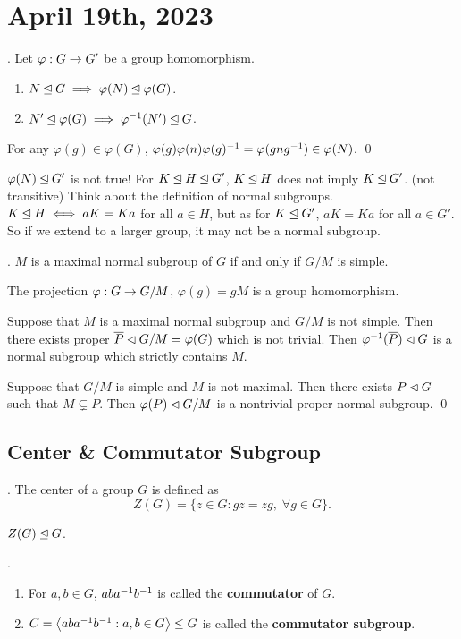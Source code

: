 \section*{April 19th, 2023}

\prop. Let \(\varphi : G \rightarrow G'\) be a group homomorphism.
\begin{enumerate}
    \item \(N \unlhd G \implies \varphi(N) \unlhd \varphi(G)\).
    \item \(N' \unlhd \varphi(G) \implies \varphi^{-1}(N') \unlhd G\).
\end{enumerate}

\pf For any \(\varphi(g) \in \varphi(G)\), \(\varphi(g) \varphi(n) \varphi(g)^{-1} = \varphi(gng^{-1}) \in \varphi(N)\). \qed

\rmk \(\varphi(N) \unlhd G'\) is not true! For \(K \unlhd H \unlhd G'\), \(K \unlhd H\) does not imply \(K \unlhd G'\). (not transitive) Think about the definition of normal subgroups. \(K \unlhd H \iff aK = Ka\) for all \(a \in H\), but as for \(K \unlhd G'\), \(aK = Ka\) for all \(a \in G'\). So if we extend to a larger group, it may not be a normal subgroup.

\thm. \(M\) is a maximal normal subgroup of \(G\) if and only if \(G/M\) is simple.

\pf The projection \(\varphi: G \rightarrow G/M\), \(\varphi(g) = gM\) is a group homomorphism.

\note{\mimp} Suppose that \(M\) is a maximal normal subgroup and \(G/M\) is not simple. Then there exists proper \(\bar{P} \pnsub G/M = \varphi(G)\) which is not trivial. Then \(\varphi\inv(\bar{P}) \pnsub G\) is a normal subgroup which strictly contains \(M\).

\note{\mimpd} Suppose that \(G/M\) is simple and \(M\) is not maximal. Then there exists \(P \lhd G\) such that \(M \subsetneq P\). Then \(\varphi(P) \lhd G/M\) is a nontrivial proper normal subgroup. \qed

\subsection*{Center \& Commutator Subgroup}

.  The center of a group \(G\) is defined as
\[
    Z(G) = \{z \in G : gz = zg,\; \forall g \in G\}.
\]

\rmk \(Z(G) \unlhd G\).

. 
\begin{enumerate}
    \item For \(a, b \in G\), \(aba^{-1} b^{-1}\) is called the \textbf{commutator} of \(G\).
    \item \(C = \left\langle aba^{-1} b^{-1} : a, b \in G \right\rangle \leq G\) is called the \textbf{commutator subgroup}.
\end{enumerate}

